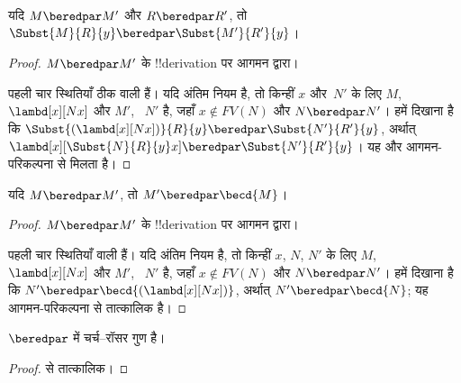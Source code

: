 \documentclass[../../../include/open-logic-section]{subfiles}
\begin{document}
\begin{lem}
  यदि $M \beredpar M'$ और $R \beredpar R'$, तो $\Subst{M}{R}{y}
  \beredpar \Subst{M'}{R'}{y}$।
\end{lem}

\begin{proof}
  $M \beredpar M'$ के !!{derivation} पर आगमन द्वारा।

  पहली चार स्थितियाँ ठीक  वाली हैं। यदि अंतिम नियम
   है, तो किन्हीं $x$ और~$N'$ के लिए $M$,
  ~$\lambd[x][Nx]$ और $M'$, ~$N'$ है, जहाँ $x \notin FV(N)$ और $N
  \beredpar N'$। हमें दिखाना है कि $\Subst{(\lambd[x][Nx])}{R}{y}
  \beredpar \Subst{N'}{R'}{y}$, अर्थात् $\lambd[x][\Subst{N}{R}{y} x]
  \beredpar \Subst{N'}{R'}{y}$। यह
   और आगमन-परिकल्पना से मिलता
  है।
\end{proof}

\begin{lem}
  यदि $M \beredpar M'$, तो $M' \beredpar \becd{M}$।
\end{lem}

\begin{proof}
  $M \beredpar M'$ के !!{derivation} पर आगमन द्वारा।

  पहली चार स्थितियाँ  वाली हैं। यदि अंतिम नियम
   है, तो किन्हीं $x$, $N$, $N'$ के लिए $M$,
  ~$\lambd[x][Nx]$ और $M'$, ~$N'$ है, जहाँ $x \notin FV(N)$ और $N
  \beredpar N'$। हमें दिखाना है कि $N' \beredpar
  \becd{(\lambd[x][Nx])}$, अर्थात् $N' \beredpar \becd{N}$; यह
  आगमन-परिकल्पना से तात्कालिक है।
\end{proof}

\begin{thm}
  $\beredpar$ में चर्च--रॉसर गुण है।
\end{thm}

\begin{proof}
   से तात्कालिक।
\end{proof}
\end{document}
